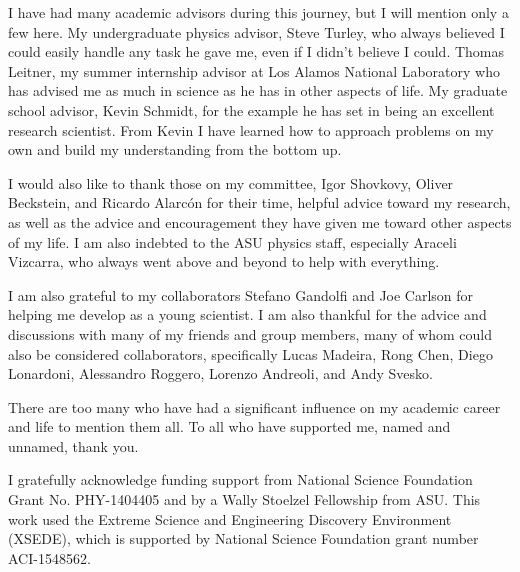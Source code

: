 \begin{acknowledgements}
I have had many academic advisors during this journey, but I will mention only a few here. My undergraduate physics advisor, Steve Turley, who always believed I could easily handle any task he gave me, even if I didn't believe I could. Thomas Leitner, my summer internship advisor at Los Alamos National Laboratory who has advised me as much in science as he has in other aspects of life. My graduate school advisor, Kevin Schmidt, for the example he has set in being an excellent research scientist. From Kevin I have learned how to approach problems on my own and build my understanding from the bottom up.

I would also like to thank those on my committee, Igor Shovkovy, Oliver Beckstein, and Ricardo Alarc\'on for their time, helpful advice toward my research, as well as the advice and encouragement they have given me toward other aspects of my life. I am also indebted to the ASU physics staff, especially Araceli Vizcarra, who always went above and beyond to help with everything.

I am also grateful to my collaborators Stefano Gandolfi and Joe Carlson for helping me develop as a young scientist. I am also thankful for the advice and discussions with many of my friends and group members, many of whom could also be considered collaborators, specifically Lucas Madeira, Rong Chen, Diego Lonardoni, Alessandro Roggero, Lorenzo Andreoli, and Andy Svesko.

There are too many who have had a significant influence on my academic career and life to mention them all. To all who have supported me, named and unnamed, thank you.

I gratefully acknowledge funding support from National Science Foundation Grant No. PHY-1404405 and by a Wally Stoelzel Fellowship from ASU. This work used the Extreme Science and Engineering Discovery Environment (XSEDE), which is supported by National Science Foundation grant number ACI-1548562.
\end{acknowledgements}
